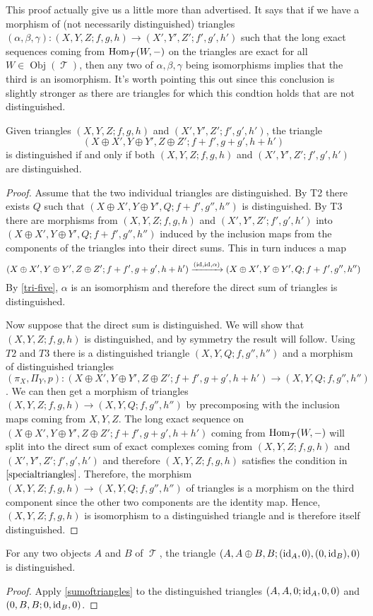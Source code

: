 \documentclass[11pt]{article}
\DeclareMathOperator{\ob}{Obj}
\DeclareMathOperator{\TT}{\mathcal{T}}
\begin{document}
\begin{rmk}\label{specialtriangles}
This proof actually give us a little more than advertised. It says that if we have a morphism of (not necessarily distinguished) triangles $(\alpha,\beta,\gamma): (X,Y,Z; f,g,h) \to (X',Y',Z'; f',g',h')$ such that the long exact sequences coming from $\Hom_{\TT}(W,-)$ on the triangles are exact for all $W \in \ob(\TT)$, then any two of $\alpha,\beta,\gamma$ being isomorphisms implies that the third is an isomorphism. It's worth pointing this out since this conclusion is slightly stronger as there are triangles for which this condtion holds that are not distinguished.
\end{rmk}

\begin{cor}\label{sumoftriangles}
	Given triangles $(X,Y,Z; f,g,h)$ and $(X',Y',Z'; f',g',h')$, the triangle
	\[
		(X \oplus X', Y \oplus Y', Z \oplus Z'; f+f', g+g', h+h')
	\]
	is distinguished if and only if both $(X,Y,Z; f,g,h)$ and $(X',Y',Z'; f',g',h')$ are distinguished.
\end{cor}
\begin{proof}
Assume that the two individual triangles are distinguished. By T2 there exists $Q$ such that $(X \oplus X', Y \oplus Y', Q; f+f', g'', h'')$ is distinguished. By T3 there are morphisms from $(X,Y,Z; f,g,h)$ and $(X',Y',Z'; f',g',h')$ into $(X \oplus X', Y \oplus Y', Q; f+f', g'', h'')$ induced by the inclusion maps from the components of the triangles into their direct sums. This in turn induces a map 
\[
	(X \oplus X', Y \oplus Y', Z \oplus Z'; f+f', g+g', h+h') \xrightarrow{(\operatorname{id},\operatorname{id},\alpha)}(X \oplus X', Y \oplus Y', Q; f+f', g'', h'')
\]
By \autoref{tri-five}, $\alpha$ is an isomorphism and therefore the direct sum of triangles is distinguished.

Now suppose that the direct sum is distinguished. We will show that $(X,Y,Z; f,g,h)$ is distinguished, and by symmetry the result will follow. Using $T2$ and $T3$ there is a distinguished triangle $(X,Y,Q; f,g'',h'')$ and a morphism of distinguished triangles $(\pi_X,\Pi_Y, p): (X \oplus X', Y \oplus Y', Z \oplus Z'; f+f', g+g', h+h') \to (X,Y,Q; f,g'',h'')$. We can then get a morphism of triangles $(X,Y,Z; f,g,h) \to (X,Y,Q; f,g'',h'')$ by precomposing with the inclusion maps coming from $X,Y,Z$. The long exact sequence on $(X \oplus X', Y \oplus Y', Z \oplus Z'; f+f', g+g', h+h')$ coming from $\Hom_{\TT}(W,-)$ will split into the direct sum of exact complexes coming from $(X,Y,Z; f,g,h)$ and $(X',Y',Z'; f',g',h')$ and therefore $(X,Y,Z; f,g,h)$ satisfies the condition in $\autoref{specialtriangles}$. Therefore, the morphism $(X,Y,Z; f,g,h) \to (X,Y,Q; f,g'',h'')$ of triangles is a morphism on the third component since the other two components are the identity map. Hence, $(X,Y,Z; f,g,h)$ is isomorphism to a distinguished triangle and is therefore itself distinguished.
\end{proof}

\begin{cor}\label{tri-dir-sum}
For any two objects $A$ and $B$ of $\TT$, the triangle $(A, A \oplus B, B; (\operatorname{id}_A,0), (0,\operatorname{id}_B),0)$ is distinguished. 
\end{cor}
\begin{proof}
Apply \autoref{sumoftriangles} to the distinguished triangles $(A,A,0; \operatorname{id}_A,0,0)$ and $(0,B,B; 0,\operatorname{id}_B,0)$.
\end{proof}
\end{document}

